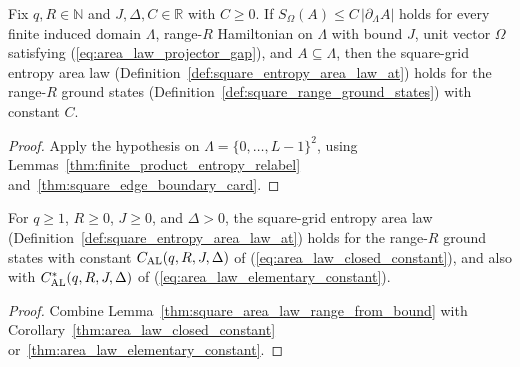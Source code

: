 \begin{lemma}
    \label{thm:square_area_law_range_from_bound}
    \leanok
    Fix $q,R\in\mathbb N$ and $J,\Delta,C\in\mathbb R$ with $C\ge0$. If $S_\Omega(A)\le C\,|\partial_\Lambda A|$ holds for every finite induced domain $\Lambda$, range-$R$ Hamiltonian on $\Lambda$ with bound $J$, unit vector $\Omega$ satisfying (\ref{eq:area_law_projector_gap}), and $A\subseteq\Lambda$, then the square-grid entropy area law (Definition~\ref{def:square_entropy_area_law_at}) holds for the range-$R$ ground states (Definition~\ref{def:square_range_ground_states}) with constant $C$.
\end{lemma}
\begin{proof}
    \leanok
    Apply the hypothesis on $\Lambda=\{0,\ldots,L-1\}^2$, using Lemmas~\ref{thm:finite_product_entropy_relabel} and~\ref{thm:square_edge_boundary_card}.
\end{proof}

\begin{corollary}
    \label{thm:square_area_law_range_constant}
    \leanok
    For $q\ge1$, $R\ge0$, $J\ge0$, and $\Delta>0$, the square-grid
    entropy area law (Definition~\ref{def:square_entropy_area_law_at}) holds
    for the range-$R$ ground states with constant
    $C_{\rm AL}(q,R,J,\Delta)$ of (\ref{eq:area_law_closed_constant}), and also with
    $C_{\rm AL}^*(q,R,J,\Delta)$ of (\ref{eq:area_law_elementary_constant}).
\end{corollary}
\begin{proof}
    \leanok
    Combine Lemma~\ref{thm:square_area_law_range_from_bound} with Corollary~\ref{thm:area_law_closed_constant} or~\ref{thm:area_law_elementary_constant}.
\end{proof}

